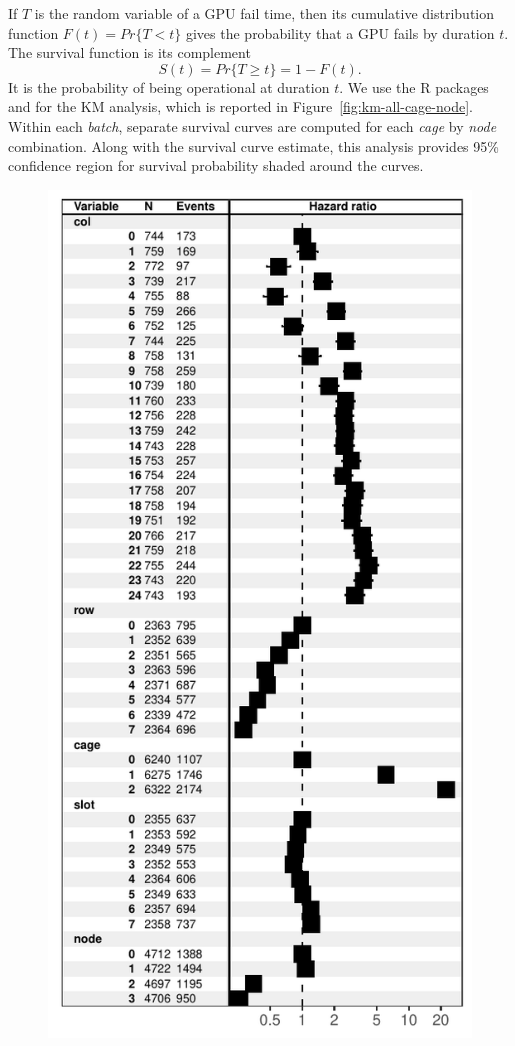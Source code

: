 If $T$ is the random variable of a GPU fail time, then its cumulative
distribution function $F(t) = Pr\{T < t\}$ gives the probability that
a GPU fails by duration $t$. The survival function is its complement
\begin{displaymath}
  S(t) = Pr\{T \geq t\} = 1 - F(t).
\end{displaymath}
It is the probability of being operational at duration $t$.  We use
the R packages  and  for the KM analysis,
which is reported in Figure~\ref{fig:km-all-cage-node}. Within each
{\em batch}, separate survival curves are computed for each {\em cage}
by {\em node} combination. Along with the survival curve estimate,
this analysis provides 95\% confidence region for survival probability
shaded around the curves.
\begin{figure}
  \centering
  \includegraphics[width=\columnwidth]{figs/cox_o001.pdf}

\end{figure}
